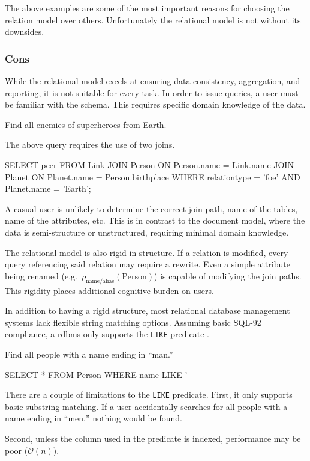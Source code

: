 			The above examples are some of the most important reasons for choosing the relation model over others.  Unfortunately the relational model is not without its downsides.
		
		\subsubsection{Cons}
			While the relational model excels at ensuring data consistency, aggregation, and reporting, it is not suitable for every task.  In order to issue queries, a user must be familiar with the schema.  This requires specific domain knowledge of the data.
			
			\begin{ex}
				Find all enemies of superheroes from Earth.
				
				The above query requires the use of two joins.
				
				\begin{singlespaced}
					\begin{sqlcode}
SELECT peer
FROM   Link
       JOIN Person
         ON Person.name = Link.name
       JOIN Planet
         ON Planet.name = Person.birthplace
WHERE  relationtype = 'foe'
       AND Planet.name = 'Earth';
					\end{sqlcode}
				\end{singlespaced}
			\end{ex}
			
			A casual user is unlikely to determine the correct join path, name of the tables, name of the attributes, etc.  This is in contrast to the document model, where the data is semi-structure or unstructured, requiring minimal domain knowledge.

			The relational model is also rigid in structure.  If a relation is modified, every query referencing said relation may require a rewrite.  Even a simple attribute being renamed (e.g.~$\rho_{\mathrm{name/alias}}(\mathrm{Person})$) is capable of modifying the join paths.  This rigidity places additional cognitive burden on users.
			
			In addition to having a rigid structure, most relational database management systems lack flexible string matching options.  Assuming basic SQL-92 compliance, a \gls{rdbms} only supports the \texttt{LIKE} predicate \cite{sql-2011}.
			
			\begin{ex}
				Find all people with a name ending in ``man.''
				
				\begin{singlespaced}
					\begin{sqlcode}
SELECT *
FROM   Person
WHERE  name LIKE '%
					\end{sqlcode}
				\end{singlespaced}
			\end{ex}
			
			There are a couple of limitations to the \texttt{LIKE} predicate.  First, it only supports basic substring matching.  If a user accidentally searches for all people with a name ending in ``men,'' nothing would be found.
			
			Second, unless the column used in the predicate is indexed, performance may be poor ($\mathcal{O}\left(n\right)$).